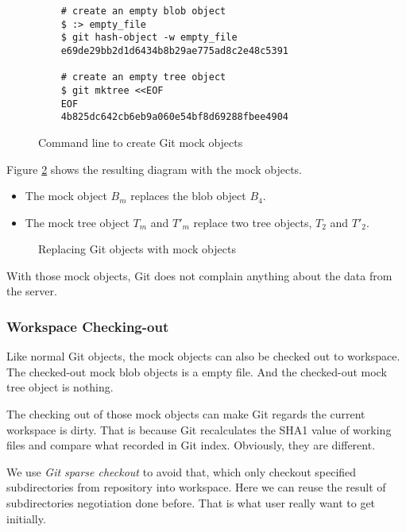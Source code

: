 \documentclass[preprint]{sigplanconf}
\begin{document}
\begin{figure}[htpb]
  \centering
  \begin{verbatim}
    # create an empty blob object
    $ :> empty_file
    $ git hash-object -w empty_file
    e69de29bb2d1d6434b8b29ae775ad8c2e48c5391

    # create an empty tree object
    $ git mktree <<EOF
    EOF
    4b825dc642cb6eb9a060e54bf8d69288fbee4904
  \end{verbatim}
  \caption{Command line to create Git mock objects}
  \label{fig:cmd-create-mock}
\end{figure}

Figure \ref{fig:mock-objects} shows the resulting diagram with the mock objects.

\begin{itemize}
  \item The mock object $B_m$ replaces the blob object $B_4$.
  \item The mock tree object $T_m$ and $T'_m$ replace two tree objects, $T_2$ and $T'_2$.
\end{itemize}

\begin{figure}[htpb]
  \centering
  
  \caption{Replacing Git objects with mock objects}
  \label{fig:mock-objects}
\end{figure}

With those mock objects, Git does not complain anything about the data from the server.

\subsubsection{Workspace Checking-out}
Like normal Git objects, the mock objects can also be checked out to workspace.
The checked-out mock blob objects is a empty file.
And the checked-out mock tree object is nothing.

The checking out of those mock objects can make Git regards the current
workspace is dirty.
That is because Git recalculates the SHA1 value of working files and compare what recorded in Git index.
Obviously, they are different.

We use \emph{Git sparse checkout} \cite{sparseco} to avoid that, which only
checkout specified subdirectories from repository into workspace.
Here we can reuse the result of subdirectories negotiation done before.
That is what user really want to get initially.
\end{document}
